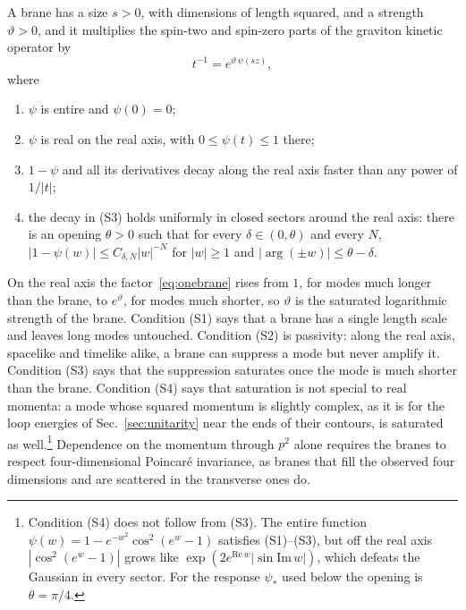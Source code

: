 \documentclass[a4paper,11pt]{article}
\begin{document}
A brane has a size $s>0$, with dimensions of length squared, and a strength $\vartheta>0$, and it multiplies the spin-two and spin-zero parts of the graviton kinetic operator by
\begin{equation}
\label{eq:onebrane}
t^{-1}=e^{\vartheta\,\psi(sz)},
\end{equation}
where
\begin{enumerate}[label=\textup{(S\arabic*)},leftmargin=2.4em,itemsep=0.15em]
\item $\psi$ is entire and $\psi(0)=0$;
\item $\psi$ is real on the real axis, with $0\le\psi(t)\le1$ there;
\item $1-\psi$ and all its derivatives decay along the real axis faster than any power of $1/|t|$;
\item the decay in (S3) holds uniformly in closed sectors around the real axis: there is an opening $\theta>0$ such that for every $\delta\in(0,\theta)$ and every $N$, $|1-\psi(w)|\le C_{\delta,N}|w|^{-N}$ for $|w|\ge1$ and $|\arg(\pm w)|\le\theta-\delta$.
\end{enumerate}
On the real axis the factor~\eqref{eq:onebrane} rises from $1$, for modes much longer than the brane, to $e^{\vartheta}$, for modes much shorter, so $\vartheta$ is the saturated logarithmic strength of the brane. Condition (S1) says that a brane has a single length scale and leaves long modes untouched. Condition (S2) is passivity: along the real axis, spacelike and timelike alike, a brane can suppress a mode but never amplify it. Condition (S3) says that the suppression saturates once the mode is much shorter than the brane. Condition (S4) says that saturation is not special to real momenta: a mode whose squared momentum is slightly complex, as it is for the loop energies of Sec.~\ref{sec:unitarity} near the ends of their contours, is saturated as well.\footnote{Condition (S4) does not follow from (S3). The entire function $\psi(w)=1-e^{-w^2}\cos^2(e^w-1)$ satisfies (S1)--(S3), but off the real axis $|\cos^2(e^w-1)|$ grows like $\exp(2e^{\mathrm{Re}\,w}|\sin\mathrm{Im}\,w|)$, which defeats the Gaussian in every sector. For the response $\psi_*$ used below the opening is $\theta=\pi/4$.} Dependence on the momentum through $p^2$ alone requires the branes to respect four-dimensional Poincar\'e invariance, as branes that fill the observed four dimensions and are scattered in the transverse ones do.
\end{document}
